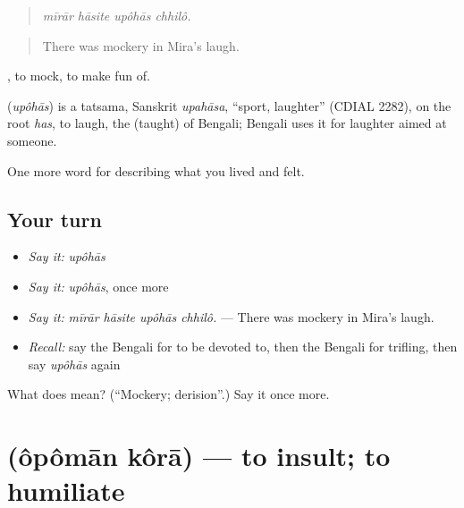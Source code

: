 \begin{quote}
   
\end{quote}

\begin{quote}
\emph{mīrār hāsite upôhās chhilô.}
\end{quote}

\begin{quote}
There was mockery in Mira's laugh.
\end{quote}

 , to mock, to make fun of.

\begin{cousinweb}
\textbf{} (\emph{upôhās}) is a tatsama, Sanskrit \emph{upahāsa}, \textquotedblleft{}sport, laughter\textquotedblright{} (CDIAL 2282), on the root \emph{has}, to laugh, the  (taught) of Bengali; Bengali uses it for laughter aimed at someone.
\end{cousinweb}

\begin{grammarlens}[title={What you've built}]
One more word for describing what you lived and felt.
\end{grammarlens}

\subsection*{Your turn}
\begin{itemize}
\raggedright
  \item \emph{Say it:} \emph{upôhās}
  \item \emph{Say it:} \emph{upôhās}, once more
  \item \emph{Say it:} \emph{mīrār hāsite upôhās chhilô.} — There was mockery in Mira's laugh.
  \item \emph{Recall:} say the Bengali for to be devoted to, then the Bengali for trifling, then say \emph{upôhās} again
\end{itemize}

\begin{tcolorbox}[breakable,colback=teal!4,colframe=teal!35!black,title={Before you move on}]
What does  mean? (\textquotedblleft{}Mockery; derision\textquotedblright{}.) Say it once more.
\end{tcolorbox}
\section[\texorpdfstring{\bn{অপমান} \bn{করা} (ôpômān kôrā)}{অপমান করা (ôpômān kôrā)}]{  (ôpômān kôrā) — to insult; to humiliate}

